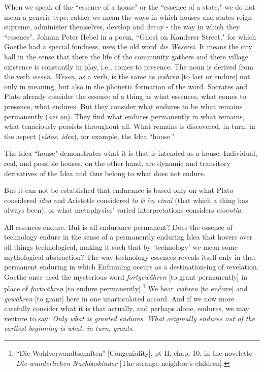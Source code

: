 \documentclass[paper=a4, fontsize=11pt,twoside]{scrartcl}
\begin{document}
When we speak of the ``essence of a house" or the ``essence of a state," we do not mean a generic type; rather we mean the ways in which houses and states reign supreme, administer themselves, develop and decay - the way in which they ``essence". Johann Peter Hebel in a poem, ``Ghost on Kanderer Street," for which Goethe had a special fondness, uses the old word \textit{die Weserei}. It means the city hall in the sense that there the life of the community gathers and there village existence is constantly in play, i.e., comes to presence. The noun is derived from the verb \textit{wesen}. \textit{Wesen}, as a verb, is the same as \textit{w{\"a}hren} [to last or endure] not only in meaning, but also in the phonetic formation of the word. Socrates and Plato already consider the essence of a thing as what essences, what comes to presence, what endures. But they consider what endures to be what remains permanently (\textit{aei on}). They find what endures permanently in what remains, what tenaciously persists throughout all. What remains is discovered, in turn, in the aspect (\textit{eidos, idea}), for example, the Idea ``house."

The Idea ``house" demonstrates what it is that is intended as a house. Individual, real, and possible houses, on the other hand, are dynamic and transitory derivatives of the Idea and thus belong to what does not endure.

But it can not be established that endurance is based only on what Plato considered \textit{idea} and Aristotle considered \textit{to ti $\bar{e}$n einai} (that which a thing has always been), or what metaphysics' varied interpretations considers \textit{essentia}.

All essences endure. But is all endurance permanent? Does the essence of technology endure in the sense of a permanently enduring Idea that hovers over all things technological, making it such that by `technology' we mean some mythological abstraction? The way technology essences reveals itself only in that permanent enduring in which Enframing occurs as a destination-ing of revelation. Goethe once used the mysterious word \textit{fortgew{\"a}hren} [to grant permanently] in place of \textit{fortw{\"a}hren} [to endure permanently].\footnote[3]{``Die Wahlverwandtschaften" [Congeniality], pt II, chap. 10, in the novelette \textit{Die wunderlichen Nachbaskinder} [The strange neighbor's children].} We hear \textit{w{\"a}hren} [to endure] and \textit{gew{\"a}hren} [to grant] here in one unarticulated accord. And if we now more carefully consider what it is that actually, and perhaps alone, endures, we may venture to say: \textit{Only what is granted endures. What originally endures out of the earliest beginning is what, in turn, grants}. 
\end{document}
